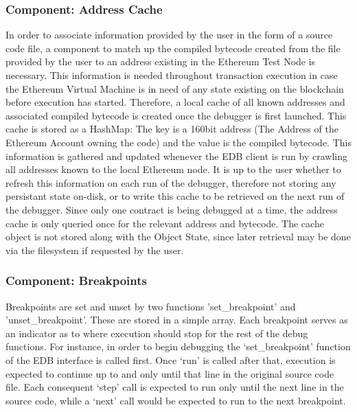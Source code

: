 \documentclass{report}
\begin{document}
    \subsubsection{Component: Address Cache}

        In order to associate information provided by the user in the form of a source code file, a component to match up the compiled bytecode created from the file provided by the user to an address existing in the Ethereum Test Node is necessary. This information is needed throughout transaction execution in case the Ethereum Virtual Machine is in need of any state existing on the blockchain before execution has started. Therefore, a local cache of all known addresses and associated compiled bytecode is created once the debugger is first launched. This cache is stored as a HashMap: The key is a 160bit address (The Address of the Ethereum Account owning the code) and the value is the compiled bytecode. This information is gathered and updated whenever the EDB client is run by crawling all addresses known to the local Ethereum node. It is up to the user whether to refresh this information on each run of the debugger, therefore not storing any persistant state on-disk, or to write this cache to be retrieved on the next run of the debugger. Since only one contract is being debugged at a time, the address cache is only queried once for the relevant address and bytecode. The cache object is not stored along with the Object State, since later retrieval may be done via the filesystem if requested by the user.

    \subsubsection{Component: Breakpoints}
        Breakpoints are set and unset by two functions 'set\_breakpoint' and 'unset\_breakpoint'. These are stored in a simple array. Each breakpoint serves as an indicator as to where execution should stop for the rest of the debug functions. For instance, in order to begin debugging the `set\_breakpoint' function of the EDB interface is called first. Once `run' is called after that, execution is expected to continue up to and only until that line in the original source code file. Each consequent `step' call is expected to run only until the next line in the source code, while a `next' call would be expected to run to the next breakpoint.
\end{document}

